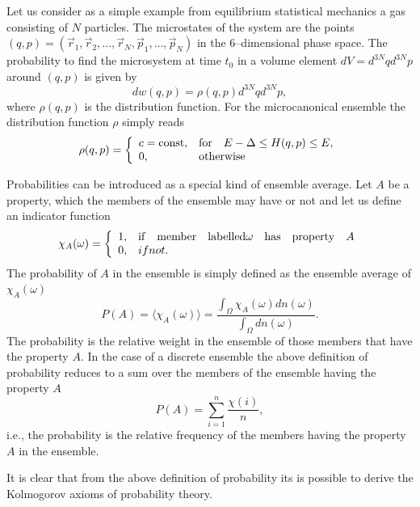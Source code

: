 Let us consider as a simple example from equilibrium statistical 
mechanics a gas consisting of $N$ particles. The microstates of 
the system are the points $(q,p) = (\vec{r}_1, \vec{r}_2, \ldots, \vec{r}_N,
\vec{p}_1,\ldots, \vec{p}_N)$ in the 6--dimensional phase space.
The probability to find the microsystem at time $t_0$ in a volume 
element $dV=d^{3N}qd^{3N}p$ around $(q,p)$ is given by
\begin{equation}
dw(q,p) = \rho(q,p) d^{3N}qd^{3N}p,
\end{equation}
where $\rho(q,p)$ is the distribution function. For the 
microcanonical ensemble  the distribution function $\rho$ simply 
reads
\begin{equation}
\rho(q,p) = \left\{ 
\begin{array}{ll}
c= {\rm const}, &{\rm for} \quad E-\Delta \le H(q,p) \le E, \\
0, &{\rm otherwise}
\end{array} \right.
\end{equation}

Probabilities can be introduced as a special kind of ensemble 
average. Let $A$ be a property, which 
the members of the ensemble may have or not and let us define an indicator
function
\begin{equation}
\chi_A(\omega) = \left\{ 
\begin{array}{ll}
1, & {\rm if \quad member \quad labelled} \omega {\rm \quad has 
\quad property\quad} A \\
0, & if not.
\end{array}\right.
\end{equation}
The probability of $A$ in the ensemble is  simply defined as 
the ensemble average of $\chi_A(\omega)$
\begin{equation}
P(A) = \langle \chi_A(\omega) \rangle = 
\frac{\int_{\Omega} \chi_A(\omega) dn(\omega)}{\int_{\Omega} 
dn(\omega)}.
\end{equation}
The probability is the relative weight in the ensemble of those 
members that have the property $A$. In the case of a discrete 
ensemble the above definition of probability reduces to a sum over
the members of the ensemble having the property $A$
\begin{equation}
P(A) = \sum_{i=1}^{n} \frac{\chi(i)}{n},
\end{equation}
i.e., the probability is the relative frequency of the members 
having the property $A$ in the ensemble.

It is clear that from the above definition of probability its is
possible to derive the Kolmogorov axioms of probability theory.


